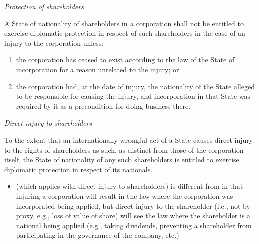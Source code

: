 \begin{conventiondetails}{}
    \flushleft
    \textit{Protection of shareholders}
    
    \vspace{\baselineskip}

    A State of nationality of shareholders in a corporation shall not be entitled to exercise diplomatic protection in respect of such shareholders in the case of an injury to the corporation unless: 
    \begin{enumerate}[label=(\alph*)]
        \item the corporation has ceased to exist according to the law of the State of incorporation for a reason unrelated to the injury; or 
        \item the corporation had, at the date of injury, the nationality of the State alleged to be responsible for causing the injury, and incorporation in that State was required by it as a precondition for doing business there. 
    \end{enumerate}
\end{conventiondetails}

\begin{conventiondetails}{}
    \flushleft
    \textit{Direct injury to shareholders}

    \vspace{\baselineskip}

    To the extent that an internationally wrongful act of a State causes direct injury to the rights of shareholders as such, as distinct from those of the corporation itself, the State of nationality of any such shareholders is entitled to exercise diplomatic protection in respect of its nationals.
\end{conventiondetails}

\begin{itemize}
    \item {} (which applies with direct injury to shareholders) is different from  in that injuring a corporation will result in the law where the corporation was incorporated being applied, but direct injury to the shareholder (i.e., not by proxy, e.g., loss of value of share) will see the law where the shareholder is a national being applied (e.g., taking dividends, preventing a shareholder from participating in the governance of the company, etc.)
\end{itemize}

